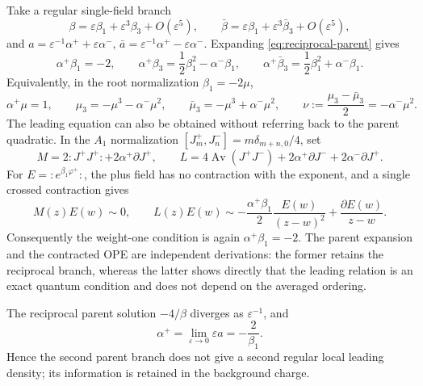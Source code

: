 \documentclass[11pt,a4paper]{article}
\numberwithin{equation}{section}
\theoremstyle{remark}
\newcommand{\Av}[1]{\operatorname{Av}\!\left(#1\right)}
\newcommand{\eps}{\varepsilon}
\begin{document}
Take a regular single-field branch
\begin{equation}
 \beta=\eps\beta_1+\eps^3\beta_3+O(\eps^5),\qquad
 \bar\beta=\eps\beta_1+\eps^3\bar\beta_3+O(\eps^5),
 \label{eq:beta-expansions}
\end{equation}
and $a=\eps^{-1}\alpha^++\eps\alpha^-$,
$\bar a=\eps^{-1}\alpha^+-\eps\alpha^-$.  Expanding
\cref{eq:reciprocal-parent} gives
\begin{equation}
 \alpha^+\beta_1=-2,\qquad
 \alpha^+\beta_3=\frac12\beta_1^2-\alpha^-\beta_1,\qquad
 \alpha^+\bar\beta_3=\frac12\beta_1^2+\alpha^-\beta_1.
 \label{eq:single-field-hierarchy}
\end{equation}
Equivalently, in the root normalization $\beta_1=-2\mu$,
\begin{equation}
 \alpha^+\mu=1,\qquad
 \mu_3=-\mu^3-\alpha^-\mu^2,\qquad
 \bar\mu_3=-\mu^3+\alpha^-\mu^2,\qquad
 \nu:=\frac{\mu_3-\bar\mu_3}{2}=-\alpha^-\mu^2.
 \label{eq:root-hierarchy}
\end{equation}
The leading equation can also be obtained without referring back to the parent quadratic.
In the $A_1$ normalization $[J_m^+,J_n^-]=m\delta_{m+n,0}/4$, set
\begin{equation}
 M=2:J^+J^+:+2\alpha^+\partial J^+,\qquad
 L=4\Av{J^+J^-}+2\alpha^+\partial J^-+2\alpha^-\partial J^+.
 \label{eq:A1-spin-two-fields}
\end{equation}
For $E=:e^{\beta_1\varphi^+}:$, the plus field has no contraction with the exponent, and a
single crossed contraction gives
\begin{equation}
 M(z)E(w)\sim0,\qquad
 L(z)E(w)\sim-\frac{\alpha^+\beta_1}{2}\frac{E(w)}{(z-w)^2}
 +\frac{\partial E(w)}{z-w}.
 \label{eq:contracted-spin-two-check}
\end{equation}
Consequently the weight-one condition is again $\alpha^+\beta_1=-2$.  The parent expansion
and the contracted OPE are independent derivations: the former retains the reciprocal branch,
whereas the latter shows directly that the leading relation is an exact quantum condition and
does not depend on the averaged ordering.

The reciprocal parent solution $-4/\beta$ diverges as $\eps^{-1}$, and
\begin{equation}
 \alpha^+=\lim_{\eps\to0}\eps a=-\frac{2}{\beta_1}.
 \label{eq:reciprocity-limit}
\end{equation}
Hence the second parent branch does not give a second regular local leading density; its
information is retained in the background charge.
\end{document}
